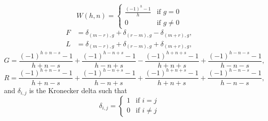 \begin{equation*}
  W(h,n) = \begin{cases} \frac{\left( -1 \right)^h -1}{h} &\text{if } g = 0 \\
    0& \text{if } g\ne 0
  \end{cases}
\end{equation*}
\begin{align*}
  F &= \delta_{(m-r),g} + \delta_{(r-m),g} - \delta_{(m+r),g}, \\
  L &= \delta_{(m-r),g} + \delta_{(r-m),g} + \delta_{(m+r),g},
\end{align*}
\begin{equation*}
  G = \frac{\left( -1 \right)^{h+n-s}-1}{h+n-s} 
    + \frac{\left( -1 \right)^{h-n+s}-1}{h-n+s}
    - \frac{\left( -1 \right)^{h+n+s}-1}{h+n+s}
    + \frac{\left( -1 \right)^{h-n-s}-1}{h-n-s},
\end{equation*}
\begin{equation*}
  R = \frac{\left( -1 \right)^{h+n-s}-1}{h+n-s} 
    + \frac{\left( -1 \right)^{h-n+s}-1}{h-n+s}
    + \frac{\left( -1 \right)^{h+n+s}-1}{h+n+s}
    + \frac{\left( -1 \right)^{h-n-s}-1}{h-n-s},
\end{equation*}
and $\delta_{i,j}$ is the Kronecker delta such that
\begin{equation*}
  \delta_{i,j} = \begin{cases} 1 & \text{if } i=j \\
    0 & \text{if } i\ne j
  \end{cases}
\end{equation*}
